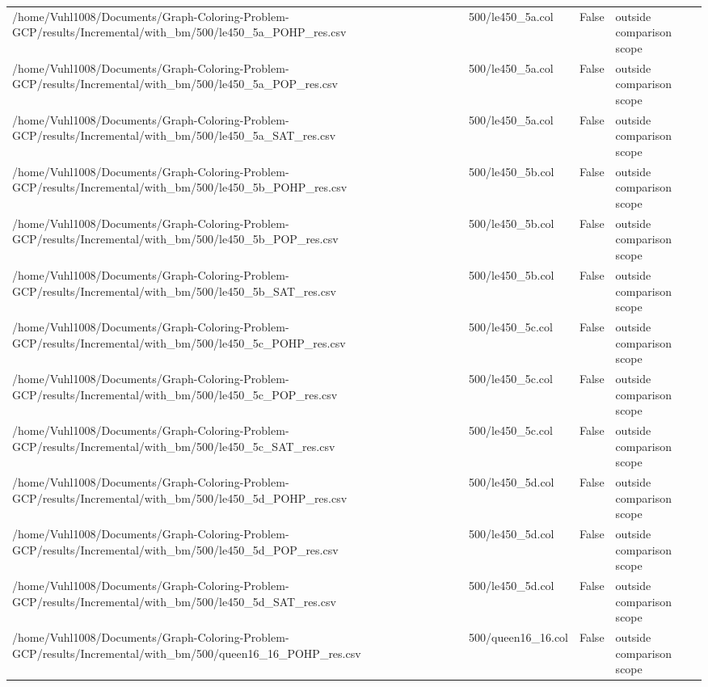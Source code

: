 \begin{table}[htbp]
\begin{tabular}{llll}
/home/Vuhl1008/Documents/Graph-Coloring-Problem-GCP/results/Incremental/with\_bm/500/le450\_5a\_POHP\_res.csv & 500/le450\_5a.col & False & outside comparison scope \\
/home/Vuhl1008/Documents/Graph-Coloring-Problem-GCP/results/Incremental/with\_bm/500/le450\_5a\_POP\_res.csv & 500/le450\_5a.col & False & outside comparison scope \\
/home/Vuhl1008/Documents/Graph-Coloring-Problem-GCP/results/Incremental/with\_bm/500/le450\_5a\_SAT\_res.csv & 500/le450\_5a.col & False & outside comparison scope \\
/home/Vuhl1008/Documents/Graph-Coloring-Problem-GCP/results/Incremental/with\_bm/500/le450\_5b\_POHP\_res.csv & 500/le450\_5b.col & False & outside comparison scope \\
/home/Vuhl1008/Documents/Graph-Coloring-Problem-GCP/results/Incremental/with\_bm/500/le450\_5b\_POP\_res.csv & 500/le450\_5b.col & False & outside comparison scope \\
/home/Vuhl1008/Documents/Graph-Coloring-Problem-GCP/results/Incremental/with\_bm/500/le450\_5b\_SAT\_res.csv & 500/le450\_5b.col & False & outside comparison scope \\
/home/Vuhl1008/Documents/Graph-Coloring-Problem-GCP/results/Incremental/with\_bm/500/le450\_5c\_POHP\_res.csv & 500/le450\_5c.col & False & outside comparison scope \\
/home/Vuhl1008/Documents/Graph-Coloring-Problem-GCP/results/Incremental/with\_bm/500/le450\_5c\_POP\_res.csv & 500/le450\_5c.col & False & outside comparison scope \\
/home/Vuhl1008/Documents/Graph-Coloring-Problem-GCP/results/Incremental/with\_bm/500/le450\_5c\_SAT\_res.csv & 500/le450\_5c.col & False & outside comparison scope \\
/home/Vuhl1008/Documents/Graph-Coloring-Problem-GCP/results/Incremental/with\_bm/500/le450\_5d\_POHP\_res.csv & 500/le450\_5d.col & False & outside comparison scope \\
/home/Vuhl1008/Documents/Graph-Coloring-Problem-GCP/results/Incremental/with\_bm/500/le450\_5d\_POP\_res.csv & 500/le450\_5d.col & False & outside comparison scope \\
/home/Vuhl1008/Documents/Graph-Coloring-Problem-GCP/results/Incremental/with\_bm/500/le450\_5d\_SAT\_res.csv & 500/le450\_5d.col & False & outside comparison scope \\
/home/Vuhl1008/Documents/Graph-Coloring-Problem-GCP/results/Incremental/with\_bm/500/queen16\_16\_POHP\_res.csv & 500/queen16\_16.col & False & outside comparison scope \\

\end{tabular}
\end{table}
